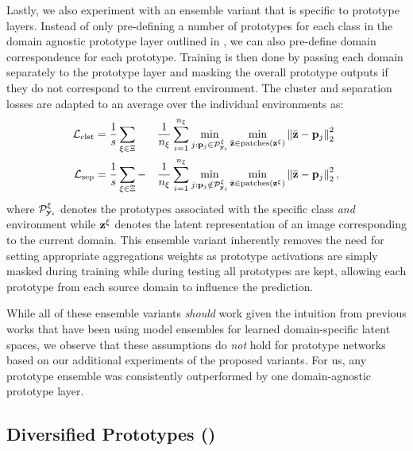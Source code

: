 Lastly, we also experiment with an ensemble variant that is specific to prototype layers. Instead of only pre-defining a number of prototypes for each class in the domain agnostic prototype layer outlined in , we can also pre-define domain correspondence for each prototype. Training is then done by passing each domain separately to the prototype layer and masking the overall prototype outputs if they do not correspond to the current environment. The cluster and separation losses are adapted to an average over the individual environments as:
\begin{alignat}{3}
\label{eq:prototype_losses_domain}
    \mathcal{L}_{\mathrm{clst}} &= \frac{1}{s} \sum_{\xi \in \Xi} &&\frac{1}{n_\xi} \sum_{i=1}^{n_\xi} \min_{j: \mathbf{p}_{j}\in \mathcal{P}_{\mathbf{y}_i}^\xi} \min_{\Bar{\mathbf{z}} \in \text{patches}(\mathbf{z}^\xi)} \left\|\Bar{\mathbf{z}} - \mathbf{p}_{j}\right\|^2_2\\
    \mathcal{L}_{\mathrm{sep}} &= \frac{1}{s} \sum_{\xi \in \Xi}-&&\frac{1}{n_\xi} \sum_{i=1}^{n_\xi} \min_{j: \mathbf{p}_{j} \notin \mathcal{P}_{\mathbf{y}_i}^\xi} \min_{\Bar{\mathbf{z}} \in \text{patches}(\mathbf{z}^\xi)} \left\|\Bar{\mathbf{z}} - \mathbf{p}_{j}\right\|^2_2,
\end{alignat}
where $\mathcal{P}_{\mathbf{y}_i}^\xi$ denotes the prototypes associated with the specific class \emph{and} environment while $\mathbf{z}^\xi$ denotes the latent representation of an image corresponding to the current domain. This ensemble variant inherently removes the need for setting appropriate aggregations weights as prototype activations are simply masked during training while during testing all prototypes are kept, allowing each prototype from each source domain to influence the prediction.  

While all of these ensemble variants \emph{should} work given the intuition from previous works that have been using model ensembles for learned domain-specific latent spaces, we observe that these assumptions do \emph{not} hold for prototype networks based on our additional experiments of the proposed variants. For us, any prototype ensemble was consistently outperformed by one domain-agnostic prototype layer. 

\subsection{Diversified Prototypes (\prodrop)}

